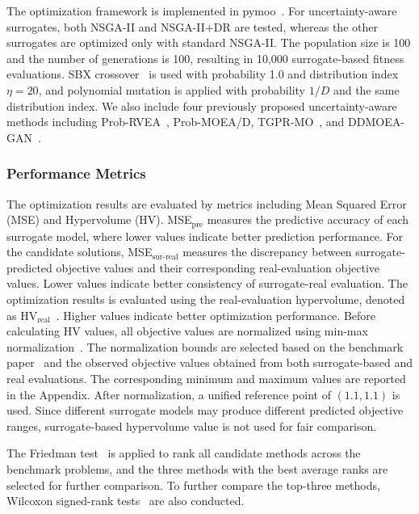 \documentclass[conference]{IEEEtran}
\begin{document}
The optimization framework is implemented in pymoo~\cite{pymoo}. For uncertainty-aware surrogates, both NSGA-II and NSGA-II+DR are tested, whereas the other surrogates are optimized only with standard NSGA-II. The population size is 100 and the number of generations is 100, resulting in 10,000 surrogate-based fitness evaluations. SBX crossover~\cite{opt-sbx} is used with probability 1.0 and distribution index $\eta=20$, and polynomial mutation is applied with probability $1/D$ and the same distribution index. We also include four previously proposed uncertainty-aware methods including Prob-RVEA~\cite{ddeo_rvea}, Prob-MOEA/D, TGPR-MO~\cite{ddeo-TGPR}, and DDMOEA-GAN~\cite{ddea_gan}.

\subsubsection{Performance Metrics} \label{sec: metrics}
The optimization results are evaluated by metrics including Mean Squared Error (MSE) and Hypervolume (HV). MSE$_{\mathrm{pre}}$ measures the predictive accuracy of each surrogate model, where lower values indicate better prediction performance. For the candidate solutions, MSE$_{\mathrm{sur\mbox{-}real}}$ measures the discrepancy between surrogate-predicted objective values and their corresponding real-evaluation objective values. Lower values indicate better consistency of surrogate-real evaluation. The optimization results is evaluated using the real-evaluation hypervolume, denoted as HV$_{\mathrm{real}}$~\cite{hypervolume}. Higher values indicate better optimization performance. Before calculating HV values, all objective values are normalized using min-max normalization~\cite{min_max}. The normalization bounds are selected based on the benchmark paper~\cite{xue2024offline} and the observed objective values obtained from both surrogate-based and real evaluations. The corresponding minimum and maximum values are reported in the Appendix. After normalization, a unified reference point of $(1.1, 1.1)$ is used. Since different surrogate models may produce different predicted objective ranges, surrogate-based hypervolume value is not used for fair comparison. 

The Friedman test~\cite{friedman} is applied to rank all candidate methods across the benchmark problems, and the three methods with the best average ranks are selected for further comparison. To further compare the top-three methods, Wilcoxon signed-rank tests~\cite{wilcoxon} are also conducted.
\end{document}
